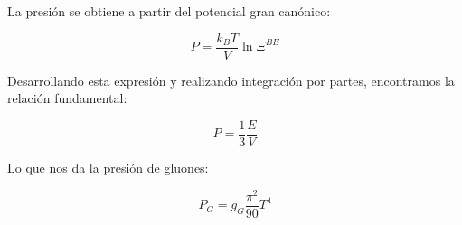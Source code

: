 

La presión se obtiene a partir del potencial gran canónico:

\begin{equation}\label{eq-BE-P1}
P = \frac{k_B T}{V} \ln \Xi^{BE}
\end{equation}

Desarrollando esta expresión y realizando integración por partes, encontramos la relación fundamental:

\begin{equation}\label{eq-BE-P2}
P = \frac{1}{3} \frac{E}{V}
\end{equation}

Lo que nos da la presión de gluones:

\begin{equation}\label{eq-BE-Pgluons}
P_G = g_G \frac{\pi^2}{90} T^4
\end{equation}






